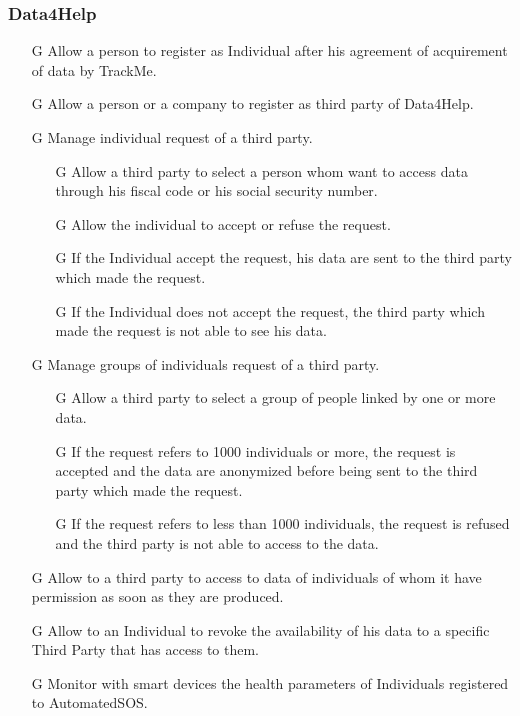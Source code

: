 \documentclass[../../rasd.tex]{subfiles}
\begin{document}
				\subsubsection{Data4Help}
					\begin{itemize}
						\item[G\subs{1}]Allow a person to register as Individual after his agreement of acquirement of data by TrackMe.
						\item[G\subs{2}]Allow a person or a company to register as third party of Data4Help.
						\item[G\subs{3}]Manage individual request of a third party.
							\begin{itemize}
								\item [G\subs{3.1}]Allow a third party to select a person whom want to access data through his fiscal code or his social security number.
								\item [G\subs{3.2}]Allow the individual to accept or refuse the request.
								\item [G\subs{3.3}]If the Individual accept the request, his data are sent to the third party which made the request.
								\item [G\subs{3.4}]If the Individual does not accept the request, the third party which made the request is not able to see his data.
							\end{itemize}	
						\item [G\subs{4}]Manage groups of individuals request of a third party.
							\begin{itemize}
								\item [G\subs{4.1}]Allow a third party to select a group of people linked by one or more data.
								\item [G\subs{4.2}]If the request refers to 1000 individuals or more, the request is accepted and the data are anonymized before being sent to the third party which made the request.
								\item [G\subs{4.3}]If the request refers to less than 1000 individuals, the request is refused and the third party is not able to access to the data.
							\end{itemize}								
						\item[G\subs{5}]Allow to a third party to access to data of individuals of whom it have permission as soon as they are produced.
						\item[G\subs{6}]Allow to an Individual to revoke the availability of his data to a specific Third Party that has access to them.	
						\item[G\subs{7}]Monitor with smart devices the health parameters of Individuals registered to AutomatedSOS.
					\end{itemize}
\end{document}
